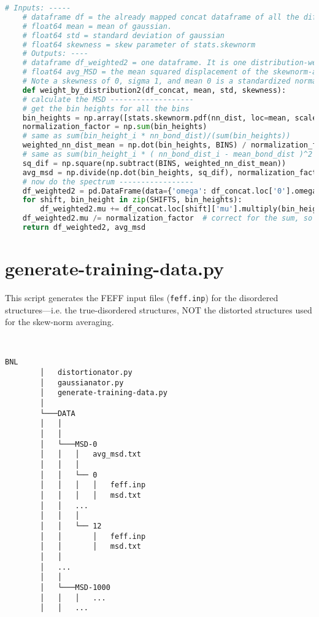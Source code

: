 \pagebreak
\begin{lstlisting}[language=Python]
    # Inputs: -----
    # dataframe df = the already mapped concat dataframe of all the different delta_rho shifted feff xanes
    # float64 mean = mean of gaussian.
    # float64 std = standard deviation of gaussian
    # float64 skewness = skew parameter of stats.skewnorm
    # Outputs: ----
    # dataframe df_weighted2 = one dataframe. It is one distribution-weighted spectra with cols=['omega','mu']
    # float64 avg_MSD = the mean squared displacement of the skewnorm-averaged spectrum
    # Note a skewness of 0, sigma 1, and mean 0 is a standardized normal distribution.
    def weight_by_distribution2(df_concat, mean, std, skewness):
    # calculate the MSD -------------------
    # get the bin heights for all the bins
    bin_heights = np.array([stats.skewnorm.pdf(nn_dist, loc=mean, scale=std, a=skewness) for nn_dist in BINS])
    normalization_factor = np.sum(bin_heights)
    # same as sum(bin_height_i * nn_bond_dist)/(sum(bin_heights))
    weighted_nn_dist_mean = np.dot(bin_heights, BINS) / normalization_factor
    # same as sum(bin_height_i * ( nn_bond_dist_i - mean_bond_dist )^2 )/sum(bin_heights)
    sq_dif = np.square(np.subtract(BINS, weighted_nn_dist_mean))
    avg_msd = np.divide(np.dot(bin_heights, sq_dif), normalization_factor)
    # now do the spectrum -----------------
    df_weighted2 = pd.DataFrame(data={'omega': df_concat.loc['0'].omega, 'mu': np.zeros(df_concat.loc['0'].omega.shape[0])})
    for shift, bin_height in zip(SHIFTS, bin_heights):
        df_weighted2.mu += df_concat.loc[shift]['mu'].multiply(bin_height)
    df_weighted2.mu /= normalization_factor  # correct for the sum, so the area under the PDF=1
    return df_weighted2, avg_msd
\end{lstlisting}

\pagebreak
\section{generate-training-data.py}
This script generates the FEFF input files (\texttt{feff.inp}) for the disordered structures---i.e. the true-disordered structures, NOT the distorted structures used for the skew-norm averaging.

\begin{minipage}{\linewidth}
    ~ \\
    \begin{Verbatim}[samepage=false]
        BNL
        │   distortionator.py
        │   gaussianator.py
        │   generate-training-data.py
        │       
        └───DATA
        │   │       
        │   │
        │   └───MSD-0
        │   │   │   avg_msd.txt
        │   │   │
        │   │   └── 0
        │   │   │   │   feff.inp
        │   │   │   │   msd.txt
        │   │   ...
        │   │   │
        │   │   └── 12
        │   │       │   feff.inp
        │   │       │   msd.txt
        │   │       
        │   ...
        │   │
        │   └───MSD-1000
        │   │   │   ...
        │   │   ...

    \end{Verbatim}
    ~
    \end{minipage}

